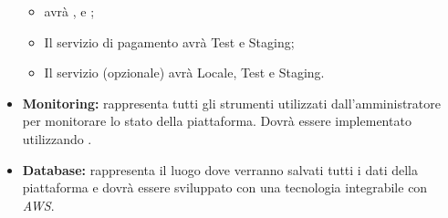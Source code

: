 \begin{itemize}
    \begin{itemize}
        \item {} avrà ,  e ;
        \item Il servizio di pagamento avrà Test e Staging;
        \item Il servizio  (opzionale) avrà Locale, Test e Staging.
    \end{itemize}
    \item \textbf{Monitoring:} rappresenta tutti gli strumenti utilizzati dall'amministratore per monitorare lo stato della piattaforma. Dovrà essere implementato utilizzando .
    \item \textbf{Database:} rappresenta il luogo dove verranno salvati tutti i dati della piattaforma e dovrà essere sviluppato con una tecnologia integrabile con \textit{AWS}.
\end{itemize}
